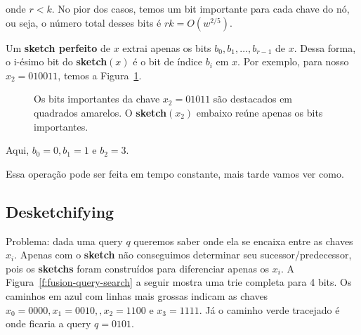 onde $r<k$. No pior dos casos, temos um bit importante para cada chave do nó, ou
seja, o número total desses bits é $rk = O(w^{2/5})$. 

Um \textbf{sketch perfeito} de $x$ extrai apenas os bits $b_0,b_1,\dots,
b_{r-1}$ de $x$. Dessa forma, o i-ésimo bit do \textbf{sketch}$(x)$ é o bit de
índice $b_i$ em $x$. Por exemplo, para nosso $x_2=010011$, temos a
Figura~\ref{f:fusion-sketch}.

\begin{figure}[h]
\centering
{}
\caption{Os bits importantes da chave $x_2=01011$ são destacados em quadrados
amarelos. O \textbf{sketch}$(x_2)$ embaixo reúne apenas os bits
importantes.\label{f:fusion-sketch}}
\end{figure}

Aqui, $b_0=0,b_1=1$ e $b_2=3$.

Essa operação pode ser feita em tempo constante, mais tarde vamos ver como.

\subsection{Desketchifying}

Problema: dada uma query $q$ queremos saber onde ela se encaixa entre as chaves
$x_i$. Apenas com o \textbf{sketch} não conseguimos determinar seu
sucessor/predecessor, pois os \textbf{sketchs} foram construídos para
diferenciar apenas os $x_i$. A Figura~\ref{f:fusion-query-search} a seguir
mostra uma trie completa para 4 bits. Os caminhos em azul com linhas mais
grossas indicam as chaves $x_0=0000,x_1=0010,,x_2=1100$ e $x_3=1111$. Já o
caminho verde tracejado é onde ficaria a query $q=0101$.

